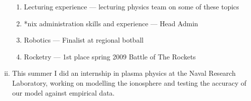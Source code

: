 \documentclass[11pt,notitlepage]{article}
\begin{document}
\begin{enumerate}[i)]
\begin{enumerate}
      \item Lecturing experience --- lecturing physics team on some of these topics
      \item *nix administration skills and experience --- Head Admin
      \item Robotics --- Finalist at regional botball
      \item Rocketry --- 1st place spring 2009 Battle of The Rockets
    \end{enumerate}
 \item This summer I did an internship in plasma physics at the Naval Research Laboratory, working on modelling the ionosphere and testing the accuracy of our model against empirical data. 
\end{enumerate}
\end{document}

